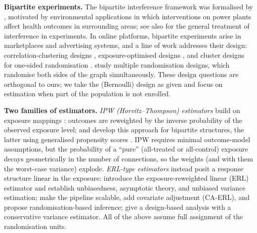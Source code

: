 \documentclass[sigconf,anonymous,review]{acmart}
\newcounter{assumption}
\begin{document}
\textbf{Bipartite experiments.} The bipartite interference framework was formalised by \citet{zigler2021bipartite}, motivated by environmental applications in which interventions on power plants affect health outcomes in surrounding areas; see also \citet{hudgens2008toward,aronow2017estimating,eckles2017design} for the general treatment of interference in experiments. In online platforms, bipartite experiments arise in marketplaces and advertising systems, and a line of work addresses their design: correlation-clustering designs \cite{pouget2019variance}, exposure-optimised designs \cite{harshaw2023erl}, and cluster designs for one-sided randomisation \cite{brennan2022cluster}. \citet{bajari2021multiple} study multiple randomisation designs, which randomise both sides of the graph simultaneously. These design questions are orthogonal to ours; we take the (Bernoulli) design as given and focus on estimation when part of the population is not enrolled.

\textbf{Two families of estimators.} \emph{IPW (Horvitz--Thompson) estimators} build on exposure mappings \cite{aronow2017estimating}: outcomes are reweighted by the inverse probability of the observed exposure level; \citet{zigler2021bipartite} and \citet{doudchenko2020causal} develop this approach for bipartite structures, the latter using generalised propensity scores \cite{hirano2004propensity}. IPW requires minimal outcome-model assumptions, but the probability of a ``pure'' (all-treated or all-control) exposure decays geometrically in the number of connections, so the weights (and with them the worst-case variance) explode. \emph{ERL-type estimators} instead posit a response structure linear in the exposure: \citet{harshaw2023erl} introduce the exposure-reweighted linear (ERL) estimator and establish unbiasedness, asymptotic theory, and unbiased variance estimation; \citet{shi2025scalableanalysisbipartiteexperiments} make the pipeline scalable, add covariate adjustment (CA-ERL), and propose randomisation-based inference; \citet{lu2025design} give a design-based analysis with a conservative variance estimator. All of the above assume full assignment of the randomisation units.
\end{document}
